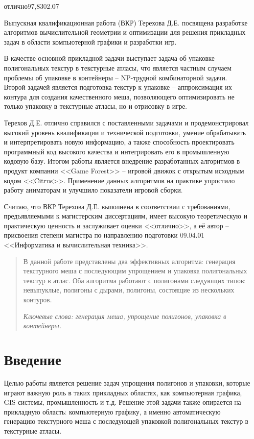 \documentclass{fefu_thesis/cls/fefu}
\begin{document}
    \begin{supervisorreview}{отлично}{97,83}{02.07}
		\par Выпускная квалификационная работа (ВКР) Терехова Д.Е. посвящена разработке алгоритмов вычислительной геометрии и оптимизации для решения прикладных задач в области компьютерной графики и разработки игр.
		\par В качестве основной прикладной задачи выступает задача об упаковке полигональных текстур в текстурные атласы, что является частным случаем проблемы об упаковке в контейнеры -- NP-трудной комбинаторной задачи. Второй задачей является подготовка текстур к упаковке -- аппроксимация их контура для создания качественного меша, позволяющего оптимизировать не только упаковку в текстурные атласы, но и отрисовку в игре.
        \par Терехов Д.Е. отлично справился с поставленными задачами и продемонстрировал высокий уровень квалификации и технической подготовки, умение обрабатывать и интерпретировать новую информацию, а также способность проектировать программный код высокого качества и интегрировать его в промышленную кодовую базу. Итогом работы является внедрение разработанных алгоритмов в продукт компании <<Game Forest>> -- игровой движок с открытым исходным кодом <<Citrus>>. Применение данных алгоритмов на практике упростило работу аниматорам и улучшило показатели игровой сборки.
		\par Считаю, что ВКР Терехова Д.Е. выполнена в соответствии с требованиями, предъявляемыми к магистерским диссертациям, имеет высокую теоретическую и практическую ценность и заслуживает оценки <<отлично>>, а её автор -- присвоения степени магистра по направлению подготовки 09.04.01 <<Информатика и вычислительная техника>>.
	\end{supervisorreview}
    \begin{abstract}
        В данной работе представлены два эффективных алгоритма: генерация текстурного меша с последующим упрощением и упаковка полигональных текстур в атлас. Оба алгоритма работают с полигонами следующих типов: невыпуклые, полигоны с дырами, полигоны, состоящие из нескольких контуров.

        \textit{Ключевые слова: генерация меша, упрощение полигонов, упаковка в контейнеры.}
    \end{abstract}
    \pagebreak
    \tableofcontents
    \pagebreak
    {\centering\section*{Введение}}
    Целью работы является решение задач упрощения полигонов и упаковки, которые играют важную роль в таких прикладных областях, как компьютерная графика, GIS системы, промышленность и т.д. Решение этой задачи также опирается на прикладную область: компьютерную графику, а именно автоматическую генерацию текстурного меша с последующей упаковкой полигональных текстур в текстурные атласы.
\end{document}
